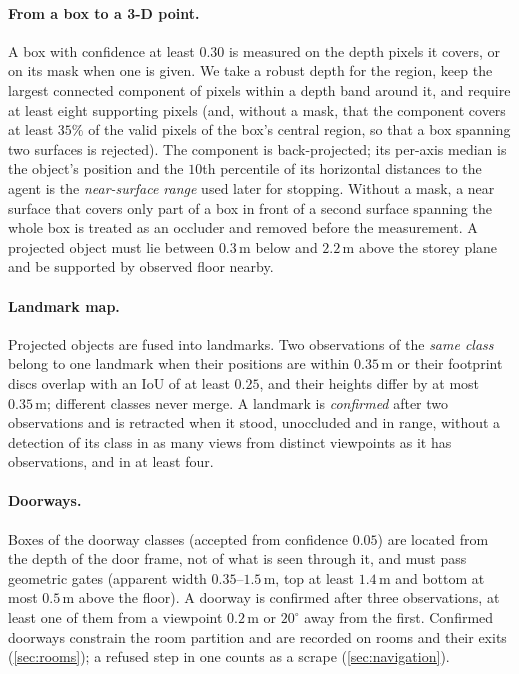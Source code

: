 \documentclass[10pt]{article}
\newcommand{\m}{\,\mathrm{m}}
\newcommand{\degree}{^{\circ}}
\begin{document}
\paragraph{From a box to a 3-D point.} A box with confidence at least $0.30$
is measured on the depth pixels it covers, or on its mask when one is given.
We take a robust depth for the region, keep the largest connected component of
pixels within a depth band around it, and require at least eight supporting
pixels (and, without a mask, that the component covers at least $35\%$ of the
valid pixels of the box's central region, so that a box spanning two surfaces
is rejected). The component is back-projected; its per-axis median is the
object's position and the $10$th percentile of its horizontal distances to
the agent is the \emph{near-surface range} used later for stopping. Without a
mask, a near surface that covers only part of a box in front of a second
surface spanning the whole box is treated as an occluder and removed before
the measurement. A projected object must lie between $0.3\m$ below and
$2.2\m$ above the storey plane and be supported by observed floor nearby.

\paragraph{Landmark map.} Projected objects are fused into landmarks. Two
observations of the \emph{same class} belong to one landmark when their
positions are within $0.35\m$ or their footprint discs overlap with an IoU of
at least $0.25$, and their heights differ by at most $0.35\m$; different
classes never merge. A landmark is \emph{confirmed} after two observations and
is retracted when it stood, unoccluded and in range, without a detection of
its class in as many views from distinct viewpoints as it has observations,
and in at least four.

\paragraph{Doorways.} Boxes of the doorway classes (accepted from confidence
$0.05$) are located from the depth of the door frame, not of what is seen
through it, and must pass geometric gates (apparent width $0.35$--$1.5\m$, top
at least $1.4\m$ and bottom at most $0.5\m$ above the floor). A doorway is
confirmed after three observations, at least one of them from a viewpoint
$0.2\m$ or $20\degree$ away from the first. Confirmed doorways constrain the
room partition and are recorded on rooms and their exits (\cref{sec:rooms});
a refused step in one counts as a scrape (\cref{sec:navigation}).
\end{document}
